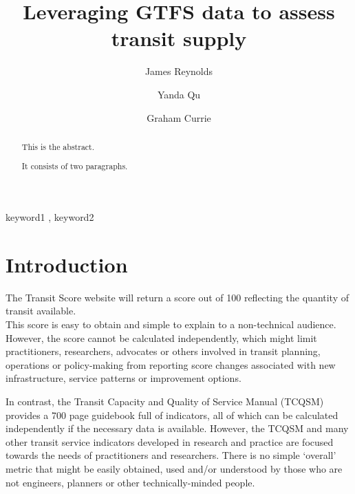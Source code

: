 \documentclass[preprint, 3p,
authoryear]{elsarticle} %
\begin{document}
\begin{frontmatter}

  \title{Leveraging GTFS data to assess transit supply}
    \author[Public Transport Research Group (PTRG)]{James Reynolds%
  }
    \author[Public Transport Research Group (PTRG)]{Yanda Qu%
  }
    \author[Public Transport Research Group (PTRG)]{Graham Currie%
  }
  
  \begin{abstract}
  This is the abstract.

  It consists of two paragraphs.
  \end{abstract}
    \begin{keyword}
    keyword1 \sep 
    keyword2
  \end{keyword}
  
 \end{frontmatter}

\hypertarget{introduction}{%
\section{Introduction}\label{introduction}}

The Transit Score website \citep{WalkScore:2023tg} will return a score
out of 100 reflecting the quantity of transit available.\\
This score is easy to obtain and simple to explain to a non-technical
audience. However, the score cannot be calculated independently, which
might limit practitioners, researchers, advocates or others involved in
transit planning, operations or policy-making from reporting score
changes associated with new infrastructure, service patterns or
improvement options.

In contrast, the Transit Capacity and Quality of Service Manual
(TCQSM)\citep{TCQSM:2013} provides a 700 page guidebook full of
indicators, all of which can be calculated independently if the
necessary data is available. However, the TCQSM and many other transit
service indicators developed in research and practice are focused
towards the needs of practitioners and researchers. There is no simple
`overall' metric that might be easily obtained, used and/or understood
by those who are not engineers, planners or other technically-minded
people.
\end{document}
